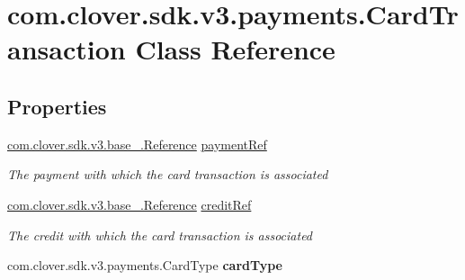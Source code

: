 \hypertarget{classcom_1_1clover_1_1sdk_1_1v3_1_1payments_1_1_card_transaction}{}\section{com.\+clover.\+sdk.\+v3.\+payments.\+Card\+Transaction Class Reference}
\label{classcom_1_1clover_1_1sdk_1_1v3_1_1payments_1_1_card_transaction}
\subsection*{Properties}
\begin{DoxyCompactItemize}
\item 
\hyperlink{classcom_1_1clover_1_1sdk_1_1v3_1_1base___1_1_reference}{com.\+clover.\+sdk.\+v3.\+base\+\_\+.\+Reference} \hyperlink{classcom_1_1clover_1_1sdk_1_1v3_1_1payments_1_1_card_transaction_ab2e18403d61ac56a7225a75a358cb8a1}{payment\+Ref}
\begin{DoxyCompactList}\small\item\em The payment with which the card transaction is associated \end{DoxyCompactList}\item 
\hyperlink{classcom_1_1clover_1_1sdk_1_1v3_1_1base___1_1_reference}{com.\+clover.\+sdk.\+v3.\+base\+\_\+.\+Reference} \hyperlink{classcom_1_1clover_1_1sdk_1_1v3_1_1payments_1_1_card_transaction_a8f4786dd82bad491ae52a4c5cc77ef7d}{credit\+Ref}
\begin{DoxyCompactList}\small\item\em The credit with which the card transaction is associated \end{DoxyCompactList}\item 
\mbox{\label{classcom_1_1clover_1_1sdk_1_1v3_1_1payments_1_1_card_transaction_aab17d3049c613ef762d112a53069289c}} 
com.\+clover.\+sdk.\+v3.\+payments.\+Card\+Type {\bfseries card\+Type}
\item 
\mbox{\label{classcom_1_1clover_1_1sdk_1_1v3_1_1payments_1_1_card_transaction_a15f204658a8a09929355d65427686a00}} 

\end{DoxyCompactItemize}

